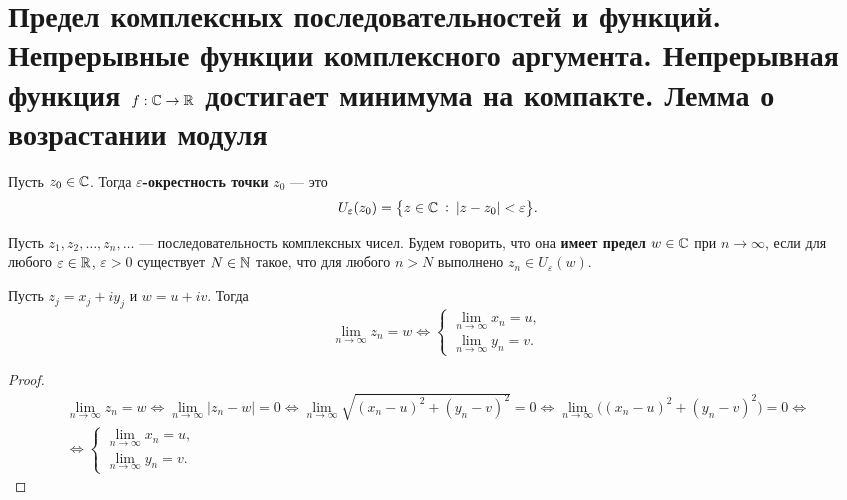 \section{Предел комплексных последовательностей и функций. Непрерывные функции комплексного аргумента. Непрерывная функция $f: \mathbb{C} \rightarrow \mathbb{R}$ достигает минимума на компакте. Лемма о возрастании модуля}

\begin{definition}
    Пусть $z_0 \in \mathbb{C}$. Тогда \textbf{$\varepsilon$-окрестность точки} $z_0$ --- это
    $$
    U_\varepsilon(z_0) = \big\{z \in \mathbb{C}\:\vcentcolon\: |z - z_0| < \varepsilon\big\}.
    $$
\end{definition}

\begin{definition}
    Пусть $z_1, z_2, \ldots, z_n, \ldots$ --- последовательность комплексных чисел. Будем говорить, что она \textbf{имеет предел} $w \in \mathbb{C}$ при $n \rightarrow \infty$, если для любого $\varepsilon \in \mathbb{R}$, $\varepsilon > 0$ существует $N \in \mathbb{N}$ такое, что для любого $n > N$ выполнено $z_n \in U_\varepsilon(w)$.
\end{definition}

\begin{lemma}
    Пусть $z_j = x_j + iy_j$ и $w = u + iv$. Тогда
    $$
    \lim_{n \rightarrow \infty} z_n = w \Leftrightarrow
    \begin{cases}
        \lim\limits_{n \rightarrow \infty}x_n = u,\\
        \lim\limits_{n \rightarrow \infty}y_n = v.
    \end{cases}
    $$
\end{lemma}

\begin{proof}
    $$
    \begin{array}{c}\displaystyle
        \lim_{n \rightarrow \infty}z_n = w \Leftrightarrow \lim_{n \rightarrow \infty}|z_n - w| = 0 \Leftrightarrow \lim_{n \rightarrow \infty}\sqrt{(x_n - u)^2 + (y_n - v)^2} = 0 \Leftrightarrow \lim_{n \rightarrow \infty}\big((x_n - u)^2 + (y_n - v)^2\big) = 0 \Leftrightarrow {}\\\displaystyle
        {} \Leftrightarrow
        \begin{cases}
            \lim\limits_{n \rightarrow \infty}x_n = u,\\
            \lim\limits_{n \rightarrow \infty}y_n = v.
        \end{cases}
    \end{array}
    $$
\end{proof}

